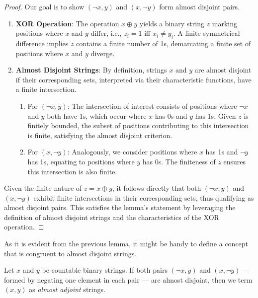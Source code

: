 \begin{proof}
  Our goal is to show $(\neg x, y)$ and $(x, \neg y)$ form almost disjoint pairs.
  
  \begin{enumerate}
    \item \textbf{XOR Operation}: The operation $x \oplus y$ yields a binary string $z$ marking positions where $x$ and $y$ differ, i.e., $z_i = 1$ iff $x_i \neq y_i$. A finite symmetrical difference implies $z$ contains a finite number of 1s, demarcating a finite set of positions where $x$ and $y$ diverge.

    \item \textbf{Almost Disjoint Strings}: By definition, strings $x$ and $y$ are almost disjoint if their corresponding sets, interpreted via their characteristic functions, have a finite intersection.
    \begin{enumerate}
      \item For $(\neg x, y)$: The intersection of interest consists of positions where $\neg x$ and $y$ both have 1s, which occur where $x$ has 0s and $y$ has 1s. Given $z$ is finitely bounded, the subset of positions contributing to this intersection is finite, satisfying the almost disjoint criterion.
      \item For $(x, \neg y)$: Analogously, we consider positions where $x$ has 1s and $\neg y$ has 1s, equating to positions where $y$ has 0s. The finiteness of $z$ ensures this intersection is also finite.
    \end{enumerate}
  \end{enumerate}

  Given the finite nature of $z = x \oplus y$, it follows directly that both $(\neg x, y)$ and $(x, \neg y)$ exhibit finite intersections in their corresponding sets, thus qualifying as almost disjoint pairs. This satisfies the lemma's statement by leveraging the definition of almost disjoint strings and the characteristics of the XOR operation. 
\end{proof}

As it is evident from the previous lemma, it might be handy to define a concept that is congruent to almost disjoint strings.

\begin{definition}\label{def_almost_adjoint_strings}
  Let $x$ and $y$ be countable binary strings. If both pairs $(\neg x,y)$ and $(x, \neg y)$ — formed by negating one element in each pair — are almost disjoint, then we term $(x,y)$ as \textit{almost adjoint} strings. 
\end{definition}

